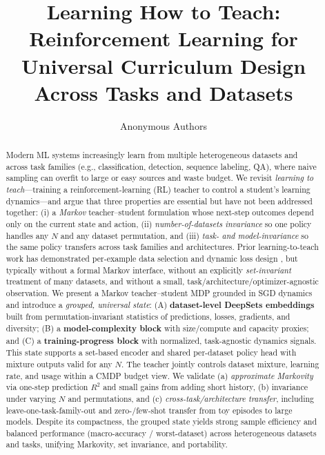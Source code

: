 \documentclass[11pt]{article}
\title{\textbf{Learning How to Teach: \\Reinforcement Learning for Universal Curriculum Design Across Tasks and Datasets}}
\author{Anonymous Authors}
\date{}
\newcommand{\1}{\mathbf{1}}
\begin{document}
\maketitle

\begin{abstract}
Modern ML systems increasingly learn from multiple heterogeneous datasets and across task families (e.g., classification, detection, sequence labeling, QA), where naive sampling can overfit to large or easy sources and waste budget. We revisit \emph{learning to teach}—training a reinforcement-learning (RL) teacher to control a student's learning dynamics—and argue that three properties are essential but have not been addressed together: (i) a \emph{Markov} teacher–student formulation whose next-step outcomes depend only on the current state and action, (ii) \emph{number-of-datasets invariance} so one policy handles any $N$ and any dataset permutation, and (iii) \emph{task- and model-invariance} so the same policy transfers across task families and architectures. Prior learning-to-teach work has demonstrated per-example data selection and dynamic loss design \citep{fan2018l2t,wu2018l2tloss}, but typically without a formal Markov interface, without an explicitly \emph{set-invariant} treatment of many datasets, and without a small, task/architecture/optimizer-agnostic observation.
We present a Markov teacher--student MDP grounded in SGD dynamics and introduce a \emph{grouped, universal state}: (A) \textbf{dataset-level DeepSets embeddings} built from permutation-invariant statistics of predictions, losses, gradients, and diversity; (B) a \textbf{model-complexity block} with size/compute and capacity proxies; and (C) a \textbf{training-progress block} with normalized, task-agnostic dynamics signals. This state supports a set-based encoder and shared per-dataset policy head with mixture outputs valid for any $N$. The teacher jointly controls dataset mixture, learning rate, and usage within a CMDP budget view. We validate (a) \emph{approximate Markovity} via one-step prediction $R^2$ and small gains from adding short history, (b) invariance under varying $N$ and permutations, and (c) \emph{cross-task/architecture transfer}, including leave-one-task-family-out and zero-/few-shot transfer from toy episodes to large models. Despite its compactness, the grouped state yields strong sample efficiency and balanced performance (macro-accuracy / worst-dataset) across heterogeneous datasets and tasks, unifying Markovity, set invariance, and portability.
\end{abstract}
\end{document}

